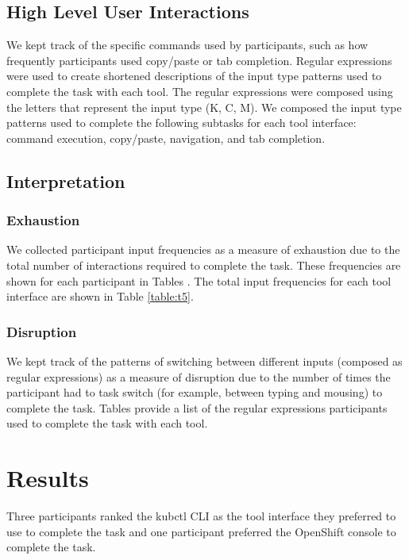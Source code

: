 \documentclass[11pt, oneside]{article}   	%
\begin{document}
\subsection{High Level User Interactions}
We kept track of the specific commands used by participants, such as how frequently participants used copy/paste or tab completion. Regular expressions were used to create shortened descriptions of the input type patterns used to complete the task with each tool. The regular expressions were composed using the letters that represent the input type (K, C, M). We composed the input type patterns used to complete the following subtasks for each tool interface: command execution, copy/paste, navigation, and tab completion. 

\subsection{Interpretation}
\subsubsection{Exhaustion}
We collected participant input frequencies as a measure of exhaustion due to the total number of interactions required to complete the task. These frequencies are shown for each participant in Tables \text{\ref{table:t1}--\ref{table:t4}}. The total input frequencies for each tool interface are shown in Table \ref{table:t5}.

\subsubsection{Disruption}
We kept track of the patterns of switching between different inputs (composed as regular expressions) as a measure of disruption due to the number of times the participant had to task switch (for example, between typing and mousing) to complete the task. Tables \text{\ref{table:t6}--\ref{table:t9}} provide a list of the regular expressions participants used to complete the task with each tool.

\section{Results}

Three participants ranked the kubctl CLI as the tool interface they preferred to use to complete the task and one participant preferred the OpenShift console to complete the task. 

\end{document}
